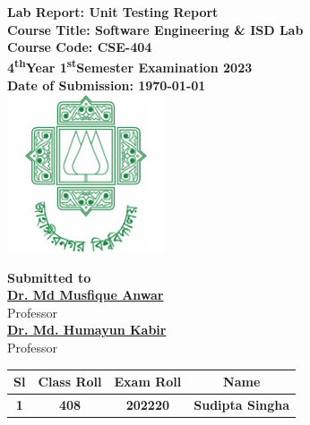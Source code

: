 \documentclass[a4paper,12pt]{article}
\begin{document}
\begin{center}
    \textbf{\large{Lab Report: Unit Testing Report}}\\
    \vspace{0.2cm}
    \textbf{Course Title: Software Engineering \& ISD Lab}\\
    \vspace{0.2cm}
    \textbf{Course Code: CSE-404}\\
    \vspace{0.2cm}
    \textbf{4\textsuperscript{th}Year 1\textsuperscript{st}Semester Examination 2023}\\
    \vspace{0.5cm}
    \textbf{Date of Submission: \today}\\

    \vspace{1.5cm}
    \includegraphics[width=0.35\textwidth]{images/logo.png}\\ %
    \vspace{1cm}

    \textbf{Submitted to}\\
    \vspace{0.2cm}
    \textbf{\href{https://juniv.edu/teachers/musfique.anwar}{Dr. Md Musfique Anwar}}\\
    {Professor}\\
    \vspace{0.2cm}
    \textbf{\href{https://juniv.edu/teachers/hkabir}{Dr. Md. Humayun Kabir}}\\
    {Professor}\\


    \vspace{1cm}

    \begin{table}[h!]
        \centering
        \begin{tabular}{|c|c|c|c|}
            \hline
            \rowcolor[HTML]{2F4F4F} %
            {\color[HTML]{FFFFFF}\textbf{Sl}}& {\color[HTML]{FFFFFF}\textbf{Class Roll}}& {\color[HTML]{FFFFFF}\textbf{Exam Roll}}& {\color[HTML]{FFFFFF}\textbf{Name}}\\ \hline
            \rowcolor[HTML]{B0E0E6}
            \textbf{1}& \textbf{408} & \textbf{202220} & \textbf{Sudipta Singha} \\ \hline
       

\end{tabular}
\end{table}
\end{center}
\end{document}
